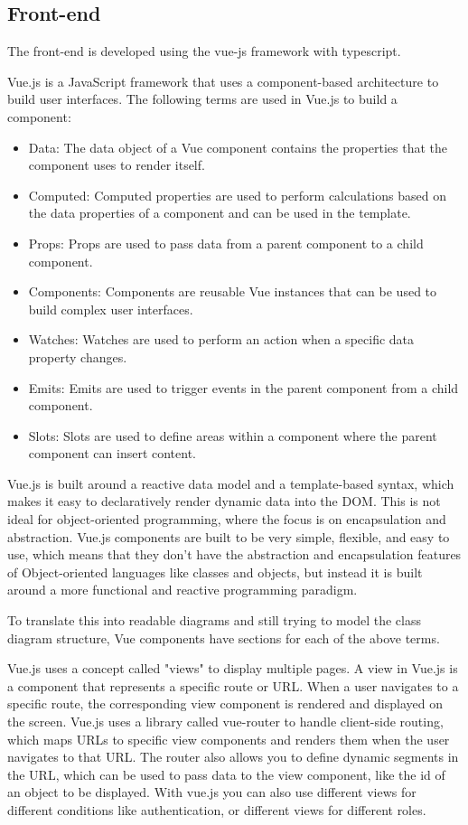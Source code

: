 \clearpage

\subsection{Front-end}
\label{ssec:object-model-front-end}
The front-end is developed using the \gls{vue-js} framework with \gls{typescript}. 

Vue.js is a JavaScript framework that uses a component-based architecture to build user interfaces. The following terms are used in Vue.js to build a component:
\begin{itemize}
    \item Data: The data object of a Vue component contains the properties that the component uses to render itself.
    \item Computed: Computed properties are used to perform calculations based on the data properties of a component and can be used in the template.
    \item Props: Props are used to pass data from a parent component to a child component.
    \item Components: Components are reusable Vue instances that can be used to build complex user interfaces.
    \item Watches: Watches are used to perform an action when a specific data property changes.
    \item Emits: Emits are used to trigger events in the parent component from a child component.
    \item Slots: Slots are used to define areas within a component where the parent component can insert content.
\end{itemize}

Vue.js is built around a reactive data model and a template-based syntax, which makes it easy to declaratively render dynamic data into the DOM. This is not ideal for object-oriented programming, where the focus is on encapsulation and abstraction. Vue.js components are built to be very simple, flexible, and easy to use, which means that they don't have the abstraction and encapsulation features of Object-oriented languages like classes and objects, but instead it is built around a more functional and reactive programming paradigm. 

To translate this into readable diagrams and still trying to model the class diagram structure, Vue components have sections for each of the above terms.

Vue.js uses a concept called "views" to display multiple pages. A view in Vue.js is a component that represents a specific route or URL. When a user navigates to a specific route, the corresponding view component is rendered and displayed on the screen. Vue.js uses a library called vue-router to handle client-side routing, which maps URLs to specific view components and renders them when the user navigates to that URL. The router also allows you to define dynamic segments in the URL, which can be used to pass data to the view component, like the id of an object to be displayed. With vue.js you can also use different views for different conditions like authentication, or different views for different roles.
 
